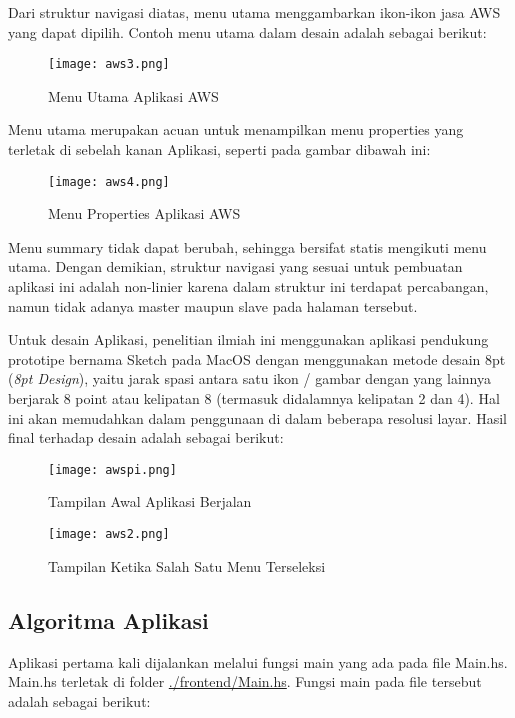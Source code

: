 \documentclass[pi.tex]{subfile}
\begin{document}
Dari struktur navigasi diatas, menu utama menggambarkan ikon-ikon jasa AWS yang dapat dipilih. Contoh menu utama dalam desain adalah sebagai berikut:

  \begin{figure}[H]
      \centering
  \texttt{[image: aws3.png]}\\
  \caption[Menu Utama Aplikasi]{Menu Utama Aplikasi AWS}
  \end{figure}

  Menu utama merupakan acuan untuk menampilkan menu properties yang terletak di sebelah kanan Aplikasi, seperti pada gambar dibawah ini:
    \begin{figure}[H]
      \centering
  \texttt{[image: aws4.png]}\\
  \caption[Menu Properties Aplikasi]{Menu Properties Aplikasi AWS}
  \end{figure}

    Menu summary tidak dapat berubah, sehingga bersifat statis mengikuti menu utama. Dengan demikian, struktur navigasi yang sesuai untuk pembuatan aplikasi ini adalah non-linier karena dalam struktur ini terdapat percabangan, namun tidak adanya master maupun slave pada halaman tersebut.

    Untuk desain Aplikasi, penelitian ilmiah ini menggunakan aplikasi pendukung prototipe bernama Sketch pada MacOS dengan menggunakan metode desain 8pt (\emph{8pt Design}), yaitu jarak spasi antara satu ikon / gambar dengan yang lainnya berjarak 8 point atau kelipatan 8 (termasuk didalamnya kelipatan 2 dan 4). Hal ini akan memudahkan dalam penggunaan di dalam beberapa resolusi layar. Hasil final terhadap desain adalah sebagai berikut:
    \begin{figure}[H]
      \centering
  \texttt{[image: awspi.png]}\\
  \caption[Tampilan Awal Aplikasi Berjalan]{Tampilan Awal Aplikasi Berjalan}
    \end{figure}

    \begin{figure}[H]
      \centering
  \texttt{[image: aws2.png]}\\
  \caption[Tampilan Seleksi Menu]{Tampilan Ketika Salah Satu Menu Terseleksi}
    \end{figure}


\subsection{Algoritma Aplikasi}
Aplikasi pertama kali dijalankan melalui fungsi main yang ada pada file Main.hs. Main.hs terletak di folder \url{./frontend/Main.hs}. Fungsi main pada file tersebut adalah sebagai berikut:
\end{document}
